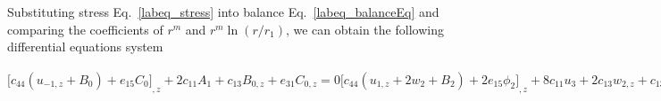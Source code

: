 \documentclass[12pt,sort&compress,fleqn,3p]{elsarticle}
\newcommand{\qiudao}[3]{ {#1} _ {{#2} , {#3}} }
\newcommand{\er}[4]{{#1}_{#2}{#3}_{#4}}
\newcommand{\de}[5]{{#1}_{#2}{#3}_{{#4},{#5}}}
\begin{document}
Substituting  stress   Eq.~\eqref{labeq_stress}  into  balance   Eq.~\eqref{labeq_balanceEq} and comparing the coefficients of $r^m$ and $r^m \ln(r/r_1)$, we can obtain the following differential equations system
\begin{subequations}\label{labeq_system}
\begin{equation}\label{labeq_system_01}
\qiudao{\big[c_{44}(u_{-1,z}+B_{0})+\er{e}{15}{C}{0}\big]}{}{z}+2\er{c}{11}{A}{1}  +\de{c}{13}{B}{0}{z}+\de{e}{31}{C}{0}{z}=0
\end{equation}
\begin{equation}\label{labeq_system_02}
\qiudao{\big[c_{44}(u_{1,z}+2w_{2}+B_{2})+2\er{e}{15}{\phi}{2}\big]}{}{z}+8c_{11}u_{3}+ 2c_{13}w_{2,z}  + c_{13}B_{2,z}+2e_{31}\phi_{2,z}=0
\end{equation}
\begin{equation}\label{labeq_system_03}
\qiudao{\big[c_{44}u_{3,z}+4c_{44}w_{4}\big]}{}{z}+4\de{c}{13}{w}{4}{z}=0
\end{equation}
\begin{equation}\label{labeq_system_04}
\big[c_{44}A_{1,z} + 2c_{44}B_2 \big]_{,z} + 2c_{13}B_{2,z} =0
\end{equation}
\begin{equation}\label{labeq_system_05}
\begin{split}
&\qiudao{\big[2c_{13}u_{1}+c_{13}A_{1}+c_{33}w_{0,z}+\de{e}{33}{\phi}{0}{z}\big]}{}{z}\\
&+c_{44}(2u_{1,z}+A_{1,z}+4w_{2}+4B_{2})+4\er{e}{15}{\phi}{2}=0
\end{split}
\end{equation}
\begin{equation}\label{labeq_system_06}
\qiudao{[4\er{c}{13}{u}{3}+\de{c}{33}{w}{2}{z}+\de{e}{33}{\phi}{2}{z}]}{}{z}+4c_{44}(u_{3,z}+4w_{4})=0
\end{equation}
\begin{equation}\label{labeq_system_07}
(c_{33}w_{4,z})_{,z}=0
\end{equation}
\begin{equation}\label{labeq_system_08}
\qiudao{\big[2\er{c}{13}{A}{1}+\de{c}{33}{B}{0}{z}+\de{e}{33}{C}{0}{z}\big]}{}{z}+2c_{44}A_{1,z}+4c_{44}B_{2}=0
\end{equation}
\begin{equation}\label{labeq_system_09}
(c_{33}B_{2,z})_{,z}=0
\end{equation}
\begin{equation}\label{labeq_system_10}
\begin{split}

\end{split}
\end{equation}
\end{subequations}
\end{document}
